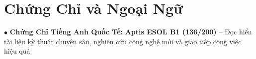 \documentclass[letterpaper,10pt]{article}
\begin{document}
\section{Chứng Chỉ và Ngoại Ngữ}
 \begin{itemize}[leftmargin=0.15in, label={}, itemsep=3pt, topsep=1pt]
    \small{\item{
     $\bullet$ \textbf{Chứng Chỉ Tiếng Anh Quốc Tế:} \textbf{Aptis ESOL B1 (136/200)} -- Đọc hiểu tài liệu kỹ thuật chuyên sâu, nghiên cứu công nghệ mới và giao tiếp công việc hiệu quả.
    }}
 \end{itemize}
\end{document}
